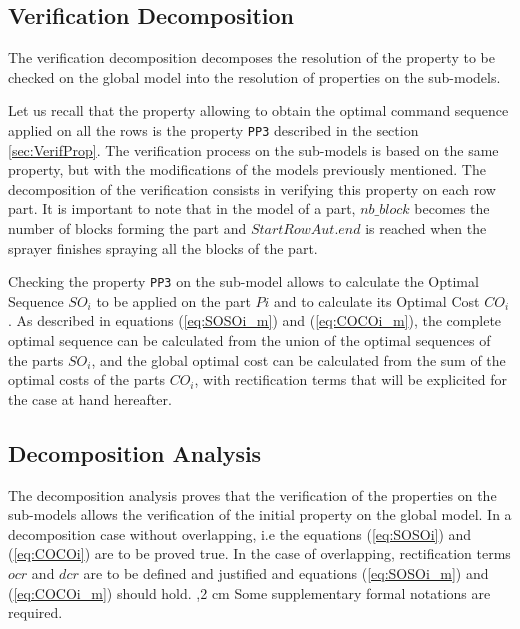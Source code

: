 \subsection{Verification Decomposition}
\label{VD}
The verification decomposition decomposes the resolution of the property to be checked on the global model into the resolution of properties on the sub-models.

Let us recall that the property allowing to obtain the optimal command sequence applied on all the rows is the property \texttt{PP3} 
described in the section \ref{sec:VerifProp}. The verification process on the sub-models is based on the same property, but with the modifications of the models previously mentioned. %
The decomposition of the verification consists in verifying this property on each row part. It is important to note that in the model of a part, $ nb\_block $ becomes the number of blocks forming the part and $ StartRowAut.end $ is reached when the sprayer finishes spraying all the blocks of the part. 

Checking the property \texttt{PP3} %
on the sub-model allows to calculate the Optimal Sequence $ SO_ {i} $ to be applied on the part $ Pi $ and to calculate its Optimal Cost $ CO_{i} $. 
As described in equations (\ref{eq:SOSOi_m}) and (\ref{eq:COCOi_m}), the complete optimal sequence can be calculated from the union of the optimal sequences of the parts $ SO_ {i} $, and the global optimal cost can be calculated from the sum of the optimal costs of the parts $ CO_{i} $, with rectification terms that will be explicited for the case at hand hereafter. 



\subsection{Decomposition Analysis}
\label{PreveComp}

The decomposition analysis proves that the verification of the properties on the sub-models allows the verification of the initial property on the global model. In a decomposition case without overlapping, i.e  the equations (\ref{eq:SOSOi}) and (\ref{eq:COCOi}) are to be proved true. In the case of overlapping, rectification terms $ocr$ and $dcr$ are to be defined and justified and equations (\ref{eq:SOSOi_m}) and (\ref{eq:COCOi_m}) should hold.
,2 cm
Some supplementary formal notations are required.

